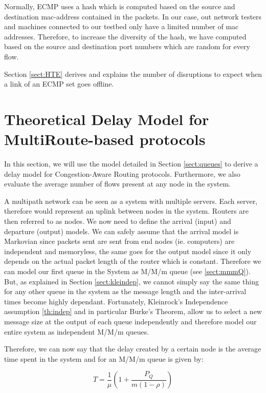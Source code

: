 Normally, ECMP uses a hash which is computed based on the source and
destination mac-address contained in the packets. In our case, out network
testers and machines connected to our testbed only have a limited number of mac
addresses. Therefore, to increase the diversity of the hash, we have computed
based on the source and destination port numbers which are random for every
flow. 

Section \ref{sect:HTE} derives and explains the number of disruptions to expect
when a link of an ECMP set goes offline.

\section{Theoretical Delay Model for MultiRoute-based protocols}

In this section, we will use the model detailed in Section
\ref{sect:queues} to derive a delay model for Congestion-Aware Routing
protocols. Furthermore, we also evaluate the average number of flows present
at any node in the system.

A multipath network can be seen as a system with multiple servers. Each server,
therefore would represent an uplink between nodes in the system. Routers are
then referred to as nodes. We now need to define the arrival (input) and
departure (output) models. We can safely assume that the arrival model is
Markovian since packets sent are sent from end nodes (ie. computers) are independent
and memoryless, the same goes for the output model since it only depends on the
actual packet length of the router which is constant. Therefore we can model
our first queue in the System as M/M/m queue (see \ref{sect:mmmQ}). But, as explained
in Section \ref{sect:kleindep}, we cannot simply say the same thing for any
other queue in the system as the message length and the inter-arrival times
become highly dependant. Fortunately, Kleinrock's Independence assumption
\ref{th:indep} and in particular Burke's Theorem, allow us to select a new message size at the output of each
queue independently and therefore model our entire system as independent M/M/m
queues.

Therefore, we can now say that the delay created by a certain node is the
average time spent in the system and for an M/M/m queue is given by:

\begin{equation}
 T = \frac{1}{\mu}\left(1 + \frac{P_{Q}}{m(1-\rho)}\right)
\label{eq:Delay1node} 
\end{equation}

